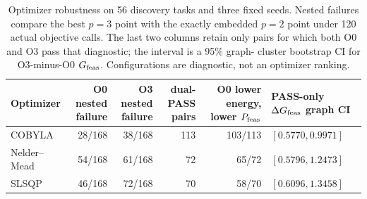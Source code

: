 \begin{table}[t]
\centering
\caption{Optimizer robustness on 56 discovery tasks and three fixed seeds.
Nested failures compare the best $p=3$ point with the exactly embedded $p=2$
point under 120 actual objective calls. The last two columns retain only pairs
for which both O0 and O3 pass that diagnostic; the interval is a 95\% graph-
cluster bootstrap CI for O3-minus-O0 $G_{\mathrm{feas}}$. Configurations are diagnostic,
not an optimizer ranking.}
\label{tab:reviewer-optimizer}
\small
\setlength{\tabcolsep}{4pt}
\begin{tabular}{@{}lrrrrl@{}}
\toprule
Optimizer & \shortstack{O0 nested\\failure} & \shortstack{O3 nested\\failure}
& \shortstack{dual-PASS\\pairs} & \shortstack{O0 lower energy,\\lower $P_{\mathrm{feas}}$}
& \shortstack{PASS-only $\Delta\gfeas$\\graph CI} \\
\midrule
COBYLA & 28/168 & 38/168 & 113 & 103/113 & $[0.5770,0.9971]$ \\
Nelder--Mead & 54/168 & 61/168 & 72 & 65/72 & $[0.5796,1.2473]$ \\
SLSQP & 46/168 & 72/168 & 70 & 58/70 & $[0.6096,1.3458]$ \\
\bottomrule
\end{tabular}
\end{table}
